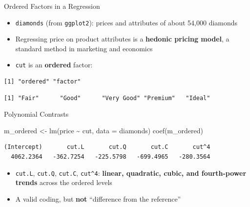 \documentclass[
  ignorenonframetext,
  aspectratio=169,
]{beamer}
\newenvironment{Shaded}{\begin{snugshade}}{\end{snugshade}}
\newcommand{\AttributeTok}[1]{\textcolor[rgb]{0.40,0.45,0.13}{#1}}
\newcommand{\FunctionTok}[1]{\textcolor[rgb]{0.28,0.35,0.67}{#1}}
\newcommand{\NormalTok}[1]{\textcolor[rgb]{0.00,0.23,0.31}{#1}}
\newcommand{\OtherTok}[1]{\textcolor[rgb]{0.00,0.23,0.31}{#1}}
\newcommand{\SpecialCharTok}[1]{\textcolor[rgb]{0.37,0.37,0.37}{#1}}
\providecommand{\tightlist}{%
  \setlength{\itemsep}{0pt}\setlength{\parskip}{0pt}}\usepackage{longtable,booktabs,array}
\begin{document}
\begin{frame}[fragile]{Ordered Factors in a Regression}
\protect\hypertarget{sec-ordered}{}
\begin{itemize}
\tightlist
\item
  \texttt{diamonds} (from \texttt{ggplot2}): prices and attributes of
  about 54,000 diamonds
\item
  Regressing price on product attributes is a \textbf{hedonic pricing
  model}, a standard method in marketing and economics
\item
  \texttt{cut} is an \textbf{ordered} factor:
\end{itemize}

\begin{Shaded}
\end{Shaded}

\begin{verbatim}
[1] "ordered" "factor" 
\end{verbatim}

\begin{Shaded}
\end{Shaded}

\begin{verbatim}
[1] "Fair"      "Good"      "Very Good" "Premium"   "Ideal"    
\end{verbatim}
\end{frame}

\begin{frame}[fragile]{Polynomial Contrasts}
\protect\hypertarget{polynomial-contrasts}{}
\begin{Shaded}
\begin{Highlighting}[]
\NormalTok{m\_ordered }\OtherTok{\textless{}{-}} \FunctionTok{lm}\NormalTok{(price }\SpecialCharTok{\textasciitilde{}}\NormalTok{ cut, }\AttributeTok{data =}\NormalTok{ diamonds)}
\FunctionTok{coef}\NormalTok{(m\_ordered)}
\end{Highlighting}
\end{Shaded}

\begin{verbatim}
(Intercept)       cut.L       cut.Q       cut.C       cut^4 
  4062.2364   -362.7254   -225.5798   -699.4965   -280.3564 
\end{verbatim}

\begin{itemize}
\tightlist
\item
  \texttt{cut.L}, \texttt{cut.Q}, \texttt{cut.C}, \texttt{cut\^{}4}:
  \textbf{linear, quadratic, cubic, and fourth-power trends} across the
  ordered levels
\item
  A valid coding, but \textbf{not} ``difference from the reference''
\end{itemize}
\end{frame}
\end{document}
